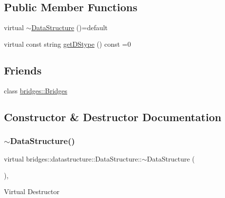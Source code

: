 \subsection*{Public Member Functions}
\begin{DoxyCompactItemize}
\item 
virtual \hyperlink{classbridges_1_1datastructure_1_1_data_structure_a54bde1c8f14ca3bff47910a2e48d586a}{$\sim$\+Data\+Structure} ()=default
\item 
virtual const string \hyperlink{classbridges_1_1datastructure_1_1_data_structure_a4ff66cb34409f11fe9fc647f6d8a22ce}{get\+D\+Stype} () const =0
\end{DoxyCompactItemize}
\subsection*{Friends}
\begin{DoxyCompactItemize}
\item 
class \hyperlink{classbridges_1_1datastructure_1_1_data_structure_a5c4164a6c5cd1eab3f12871efc2dbe26}{bridges\+::\+Bridges}
\end{DoxyCompactItemize}


\subsection{Constructor \& Destructor Documentation}
\mbox{\label{classbridges_1_1datastructure_1_1_data_structure_a54bde1c8f14ca3bff47910a2e48d586a}} 
\subsubsection{\texorpdfstring{$\sim$\+Data\+Structure()}{~DataStructure()}}
{\footnotesize\ttfamily virtual bridges\+::datastructure\+::\+Data\+Structure\+::$\sim$\+Data\+Structure (\begin{DoxyParamCaption}{ }\end{DoxyParamCaption})\hspace{0.3cm}{\ttfamily [virtual]}, {\ttfamily [default]}}

Virtual Destructor 

